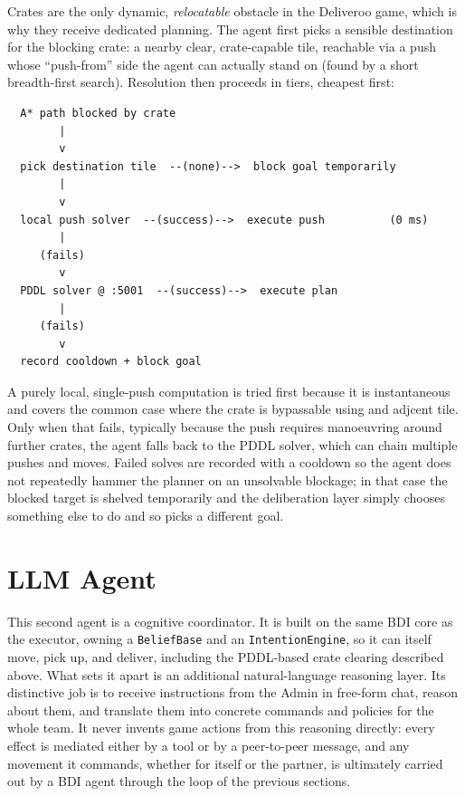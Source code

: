 \documentclass[a4paper,11pt]{article}
\begin{document}
Crates are the only dynamic, \emph{relocatable} obstacle in the Deliveroo game, which is why
they receive dedicated planning. The agent first picks a sensible destination for
the blocking crate: a nearby clear, crate-capable tile, reachable via a push whose
``push-from'' side the agent can actually stand on (found by a short breadth-first
search). Resolution then proceeds in tiers, cheapest first:

\begin{center}
\begin{verbatim}
  A* path blocked by crate
        |
        v
  pick destination tile  --(none)-->  block goal temporarily
        |
        v
  local push solver  --(success)-->  execute push          (0 ms)
        |
     (fails)
        v
  PDDL solver @ :5001  --(success)-->  execute plan
        |
     (fails)
        v
  record cooldown + block goal
\end{verbatim}
\end{center}

A purely local, single-push computation is tried first because it is instantaneous
and covers the common case where the crate is bypassable using and adjcent tile. 
Only when that fails, typically because the push
requires manoeuvring around further crates, the agent falls back to the
PDDL solver, which can chain multiple pushes and moves. Failed solves are recorded
with a cooldown so the agent does not repeatedly hammer the planner on an
unsolvable blockage; in that case the blocked target is shelved temporarily and the
deliberation layer simply chooses something else to do and so picks a different goal.




\section{LLM Agent}
\label{sec:llm}

This second agent is a cognitive coordinator. It is built on the same BDI core as the
executor, owning a \texttt{BeliefBase} and an \texttt{IntentionEngine}, so it can
itself move, pick up, and deliver, including the PDDL-based crate clearing described
above. What sets it apart is an additional natural-language reasoning layer. Its
distinctive job is to receive instructions from the Admin in free-form chat, reason
about them, and translate them into concrete commands and policies for the whole
team. It never invents game actions from this reasoning directly: every effect is
mediated either by a tool or by a peer-to-peer message, and any movement it commands,
whether for itself or the partner, is ultimately carried out by a BDI agent through
the loop of the previous sections.
\end{document}
